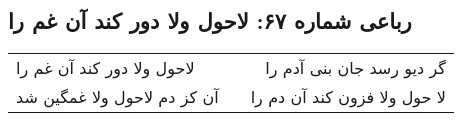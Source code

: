 \begin{center}
\section*{رباعی شماره ۶۷: لاحول ولا دور کند آن غم را}
\label{sec:0067}
\begin{longtable}{l p{0.5cm} r}
لاحول ولا دور کند آن غم را
&&
گر دیو رسد جان بنی آدم را
\\
آن کز دم لاحول ولا غمگین شد
&&
لا حول ولا فزون کند آن دم را
\\
\end{longtable}
\end{center}
